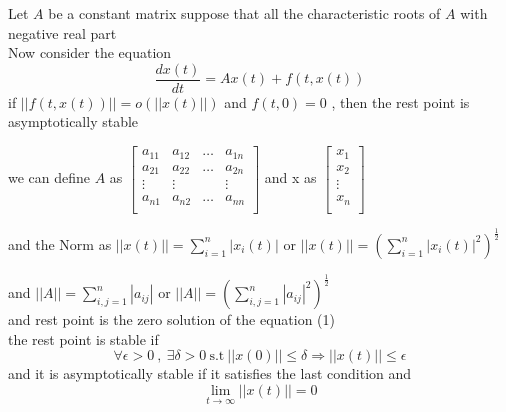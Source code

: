 \documentclass[]{article}
\begin{document}
\begin{theorem}[]

    Let $A$ be a constant matrix suppose that all the characteristic roots of $A$ with negative real part
    \\
    Now consider the equation 
\[
\frac{dx(t)}{dt} = Ax(t) + f(t,x(t))
\]
if $||f(t,x(t))|| = o(||x(t)||)$ and $f(t,0) = 0$ , then the rest point is asymptotically stable

we can define $A$ as 
$\begin{bmatrix}
    a_{11} & a_{12} & \dots & a_{1n}\\
    a_{21} & a_{22} & \dots & a_{2n}\\
    \vdots &\vdots & &\vdots \\
    a_{n1} & a_{n2} & \dots & a_{nn}\\
\end{bmatrix}$
and x as 
$\begin{bmatrix}
    x_{1}\\
    x_{2}\\
    \vdots\\
    x_{n}\\
\end{bmatrix}$
\par
and the Norm as 
\(
    \displaystyle ||x(t)|| = \sum^{n}_{i=1}|x_i(t)|    
\)
or
\(
    \displaystyle  ||x(t)|| = \left(\sum^{n}_{i=1}|x_i(t)|^2\right)^{\frac{1}{2}}    
\)
\par
and
\(
\displaystyle ||A|| = \sum^{n}_{i,j=1}|a_{ij}|    
\)
or
\(
    \displaystyle ||A|| = \left(\sum^{n}_{i,j=1}|a_{ij}|^2\right)^{\frac{1}{2}}    
\)
\\
and rest point is the zero solution of the equation (1)
\\
the rest point is stable if 
\[
\forall \epsilon >0 \  , \ \exists \delta >0 \ \text{s.t} \ || x(0)|| \leq \delta \Longrightarrow 
||x(t)|| \leq \epsilon
\]
and it is asymptotically stable if it satisfies the last condition and 
\[
\lim_{t \to \infty} ||x(t)|| = 0
\]
\end{theorem}
\end{document}
